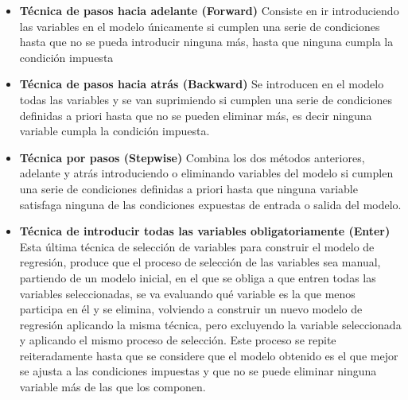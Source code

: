 \begin{itemize}
\item{\textbf{Técnica de pasos hacia adelante (Forward)} 
Consiste en ir introduciendo las variables en el modelo únicamente si cumplen una serie de condiciones hasta que no se pueda introducir 
ninguna más, hasta que ninguna cumpla la condición impuesta
}
\item{
\textbf{Técnica de pasos hacia atrás (Backward)}
Se introducen en el modelo todas las variables y se van suprimiendo si cumplen una serie de condiciones definidas a priori hasta 
que no se pueden eliminar más, es decir ninguna variable cumpla la condición impuesta.
}
\item{\textbf{Técnica por pasos (Stepwise)}
Combina los dos métodos anteriores, adelante y atrás introduciendo o eliminando variables del modelo si cumplen una serie de 
condiciones definidas a priori hasta que ninguna variable satisfaga ninguna de las condiciones expuestas de entrada o salida del modelo.
}
\item{\textbf{Técnica de introducir todas las variables obligatoriamente (Enter)}
Esta última técnica de selección de variables para construir el modelo de regresión, produce que el proceso de selección de las variables 
sea manual, partiendo de un modelo inicial, en el que se obliga a que entren todas las variables seleccionadas, se va evaluando qué variable 
es la que menos participa en él y se elimina, volviendo a construir un nuevo modelo de regresión aplicando la misma técnica, pero excluyendo 
la variable seleccionada y aplicando el mismo proceso de selección. Este proceso se repite reiteradamente hasta que se considere que el modelo 
obtenido es el que mejor se ajusta a las condiciones impuestas y que no se puede eliminar ninguna variable más de las que los componen.
}
\end{itemize}
